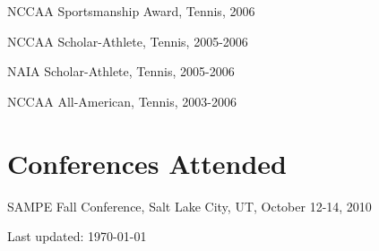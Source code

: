 \documentclass[10pt,letterpaper]{article}
\renewenvironment{itemize}{
  \begin{list}{}{
    \setlength{\leftmargin}{1.5em}
    \setlength{\itemsep}{0.25em}
    \setlength{\parskip}{0pt}
    \setlength{\parsep}{0.25em}
  }
}{
  \end{list}
}
\begin{document}
\begin{itemize}
\item NCCAA Sportsmanship Award, Tennis, 2006
\item NCCAA Scholar-Athlete, Tennis, 2005-2006
\item NAIA Scholar-Athlete, Tennis, 2005-2006
\item NCCAA All-American, Tennis, 2003-2006
\end{itemize}

\section*{Conferences Attended}

\begin{itemize}
\item SAMPE Fall Conference, Salt Lake City, UT, October 12-14, 2010
\end{itemize}

\medskip

\begin{center}
  \begin{small}
    Last updated: \today
  \end{small}
\end{center}
\end{document}
